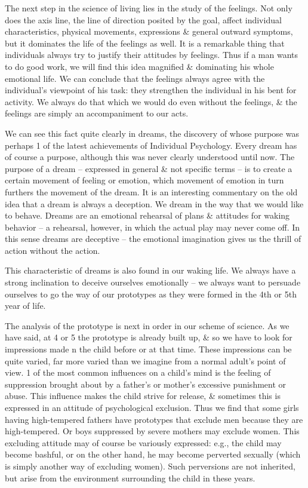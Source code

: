 \documentclass{article}
\numberwithin{equation}{section}
\begin{document}
The next step in the science of living lies in the study of the feelings. Not only does the axis line, the line of direction posited by the goal, affect individual characteristics, physical movements, expressions \& general outward symptoms, but it dominates the life of the feelings as well. It is a remarkable thing that individuals always try to justify their attitudes by feelings. Thus if a man wants to do good work, we will find this idea magnified \& dominating his whole emotional life. We can conclude that the feelings always agree with the individual's viewpoint of his task: they strengthen the individual in his bent for activity. We always do that which we would do even without the feelings, \& the feelings are simply an accompaniment to our acts.

We can see this fact quite clearly in dreams, the discovery of whose purpose was perhaps 1 of the latest achievements of Individual Psychology. Every dream has of course a purpose, although this was never clearly understood until now. The purpose of a dream -- expressed in general \& not specific terms -- is to create a certain movement of feeling or emotion, which movement of emotion in turn furthers the movement of the dream. It is an interesting commentary on the old idea that a dream is always a deception. We dream in the way that we would like to behave. Dreams are an emotional rehearsal of plans \& attitudes for waking behavior -- a rehearsal, however, in which the actual play may never come off. In this sense dreams are deceptive -- the emotional imagination gives us the thrill of action without the action.

This characteristic of dreams is also found in our waking life. We always have a strong inclination to deceive ourselves emotionally -- we always want to persuade ourselves to go the way of our prototypes as they were formed in the 4th or 5th year of life.

The analysis of the prototype is next in order in our scheme of science. As we have said, at 4 or 5 the prototype is already built up, \& so we have to look for impressions made n the child before or at that time. These impressions can be quite varied, far more varied than we imagine from a normal adult's point of view. 1 of the most common influences on a child's mind is the feeling of suppression brought about by a father's or mother's excessive punishment or abuse. This influence makes the child strive for release, \& sometimes this is expressed in an attitude of psychological exclusion. Thus we find that some girls having high-tempered fathers have prototypes that exclude men because they are high-tempered. Or boys suppressed by severe mothers may exclude women. This excluding attitude may of course be variously expressed: e.g., the child may become bashful, or on the other hand, he may become perverted sexually (which is simply another way of excluding women). Such perversions are not inherited, but arise from the environment surrounding the child in these years.
\end{document}

